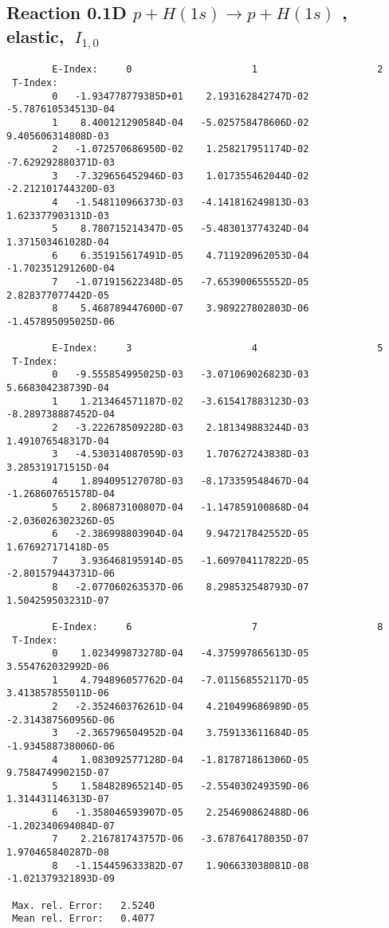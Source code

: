 \documentclass[12pt,dvipdfmx]{article}
\begin{document}
\subsection{
Reaction 0.1D  $p + H(1s) \rightarrow  p + H(1s)$ ,
elastic, $\ I_{1,0}$
}

\begin{small}\begin{verbatim}
        E-Index:     0                     1                     2
 T-Index:
        0   -1.934778779385D+01    2.193162842747D-02   -5.787610534513D-04
        1    8.400121290584D-04   -5.025758478606D-02    9.405606314808D-03
        2   -1.072570686950D-02    1.258217951174D-02   -7.629292880371D-03
        3   -7.329656452946D-03    1.017355462044D-02   -2.212101744320D-03
        4   -1.548110966373D-03   -4.141816249813D-03    1.623377903131D-03
        5    8.780715214347D-05   -5.483013774324D-04    1.371503461028D-04
        6    6.351915617491D-05    4.711920962053D-04   -1.702351291260D-04
        7   -1.071915622348D-05   -7.653900655552D-05    2.828377077442D-05
        8    5.468789447600D-07    3.989227802803D-06   -1.457895095025D-06

        E-Index:     3                     4                     5
 T-Index:
        0   -9.555854995025D-03   -3.071069026823D-03    5.668304238739D-04
        1    1.213464571187D-02   -3.615417883123D-03   -8.289738887452D-04
        2   -3.222678509228D-03    2.181349883244D-03    1.491076548317D-04
        3   -4.530314087059D-03    1.707627243838D-03    3.285319171515D-04
        4    1.894095127078D-03   -8.173359548467D-04   -1.268607651578D-04
        5    2.806873100807D-04   -1.147859100868D-04   -2.036026302326D-05
        6   -2.386998803904D-04    9.947217842552D-05    1.676927171418D-05
        7    3.936468195914D-05   -1.609704117822D-05   -2.801579443731D-06
        8   -2.077060263537D-06    8.298532548793D-07    1.504259503231D-07

        E-Index:     6                     7                     8
 T-Index:
        0    1.023499873278D-04   -4.375997865613D-05    3.554762032992D-06
        1    4.794896057762D-04   -7.011568552117D-05    3.413857855011D-06
        2   -2.352460376261D-04    4.210499686989D-05   -2.314387560956D-06
        3   -2.365796504952D-04    3.759133611684D-05   -1.934588738006D-06
        4    1.083092577128D-04   -1.817871861306D-05    9.758474990215D-07
        5    1.584828965214D-05   -2.554030249359D-06    1.314431146313D-07
        6   -1.358046593907D-05    2.254690862488D-06   -1.202340694084D-07
        7    2.216781743757D-06   -3.678764178035D-07    1.970465840287D-08
        8   -1.154459633382D-07    1.906633038081D-08   -1.021379321893D-09

 Max. rel. Error:   2.5240
 Mean rel. Error:   0.4077
\end{verbatim}\end{small}
\end{document}
